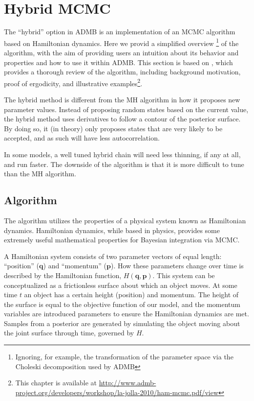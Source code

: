 \documentclass{article}\usepackage[]{graphicx}\usepackage[]{color}
\begin{document}
\section{Hybrid MCMC}\label{sec:hybrid}
The ``hybrid'' option in ADMB is an implementation of an
MCMC algorithm based on Hamiltonian dynamics. Here we provid
a simplified overview \footnote{Ignoring, for example, the
  transformation of the parameter space via the Choleski
  decomposition used by ADMB} of the algorithm, with the aim
of providing users an intuition about its behavior and
properties and how to use it within ADMB. This section is
based on \cite{brooks2011}, which provides a thorough review
of the algorithm, including background motivation, proof of
ergodicity, and illustrative examples\footnote{This chapter
  is available at
  \url{http://www.admb-project.org/developers/workshop/la-jolla-2010/ham-mcmc.pdf/view}}.

The hybrid method is different from the MH algorithm in how
it proposes new parameter values. Instead of proposing
random states based on the current value, the hybrid method
uses derivatives to follow a contour of the posterior
surface. By doing so, it (in theory) only proposes states
that are very likely to be accepted, and as such will have
less autocorrelation.

In some models, a well tuned hybrid chain will need less
thinning, if any at all, and run faster. The downside of the
algorithm is that it is more difficult to tune than the MH
algorithm.

\subsection{Algorithm}
The algorithm utilizes the properties of a physical system
known as Hamiltonian dynamics. Hamiltonian dynamics, while
based in physics, provides some extremely useful
mathematical properties for Bayesian integration via MCMC.

A Hamiltonian system consists of two parameter vectors of
equal length: ``position'' ($\mathbf{q}$) and ``momentum''
($\mathbf{p}$). How these parameters change over time is
described by the Hamiltonian function,
$H(\mathbf{q},\mathbf{p})$. This system can be
conceptualized as a frictionless surface about which an
object moves. At some time $t$ an object has a certain
height (position) and momentum. The height of the surface is
equal to the objective function of our model, and the
momentum variables are introduced parameters to ensure the
Hamiltonian dynamics are met. Samples from a posterior are
generated by simulating the object moving about the joint
surface through time, governed by $H$.
\end{document}
